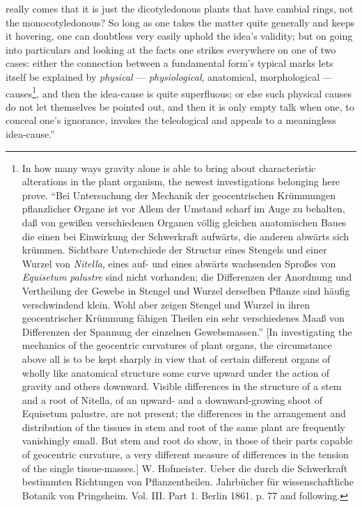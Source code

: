 \documentclass[12pt,a4paper]{book}
\begin{document}
\setcounter{footnote}{0}
really comes that it is just the dicotyledonous plants that have cambial rings,
not the monocotyledonous? So long as one takes the matter quite generally and
keeps it hovering, one can doubtless very easily uphold the idea's validity; but on
going into particulars and looking at the facts one strikes everywhere on one of
two cases: either the connection between a fundamental form's typical marks lets
itself be explained by
\emph{physical} --- \emph{physiological}, anatomical, morphological ---
causes\footnote{In how many ways gravity alone is able to bring about
characteristic alterations in the plant organism, the newest investigations
belonging here prove. ``Bei Untersuchung der Mechanik der geocentrischen
Krümmungen pflanzlicher Organe ist vor Allem der Umstand scharf im Auge zu
behalten, daß von gewißen verschiedenen Organen völlig gleichen anatomischen Baues
die einen bei Einwirkung der Schwerkraft aufwärts, die anderen abwärts sich
krümmen. Sichtbare Unterschiede der Structur eines Stengels und einer Wurzel von
\textit{Nitella}, eines auf- und eines abwärts wachsenden Sproßes von
\textit{Equisetum palustre} sind nicht vorhanden; die Differenzen der Anordnung und
Vertheilung der Gewebe in Stengel und Wurzel derselben Pflanze sind häufig
verschwindend klein. Wohl aber zeigen Stengel und Wurzel in ihren geocentrischer
Krümmung fähigen Theilen ein sehr verschiedenes Maaß von Differenzen der Spannung
der einzelnen Gewebsmassen.'' [In investigating the mechanics of the geocentric
curvatures of plant organs, the circumstance above all is to be kept sharply in
view that of certain different organs of wholly like anatomical structure some
curve upward under the action of gravity and others downward. Visible differences
in the structure of a stem and a root of Nitella, of an upward- and a
downward-growing shoot of Equisetum palustre, are not present; the differences in
the arrangement and distribution of the tissues in stem and root of the same plant
are frequently vanishingly small. But stem and root do show, in those of their
parts capable of geocentric curvature, a very different measure of differences in
the tension of the single tissue-masses.] W. Hofmeister. Ueber die durch die
Schwerkraft bestimmten Richtungen von Pflanzentheilen. Jahrbücher für
wissenschaftliche Botanik von Pringsheim. Vol. III. Part 1. Berlin 1861. p. 77 and
following.}, and then the idea-cause is quite superfluous; or else such physical
causes do not let themselves be pointed out, and then it is only empty talk when
one, to conceal one's ignorance, invokes the teleological and appeals to a
meaningless idea-cause.''
\end{document}
